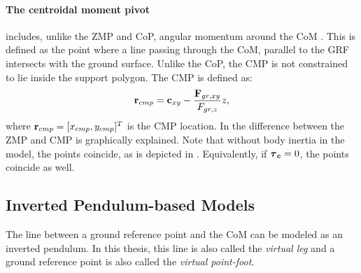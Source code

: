 \paragraph{The centroidal moment pivot} includes, unlike the \ac{ZMP} and \ac{CoP}, angular momentum around the \ac{CoM}  \cite{popovic2005ground}. This is defined as the point where a line passing through the \ac{CoM}, parallel to the \ac{GRF} intersects with the ground surface. Unlike the \ac{CoP}, the \ac{CMP} is not constrained to lie inside the support polygon. The \ac{CMP} is defined as:
\begin{equation}
    \mathbf{r}_{cmp}=\mathbf{c}_{xy}-\frac{\mathbf{F}_{gr,xy}}{F_{gr,z}}z,
    \label{eq:cmp}
\end{equation}
where $\mathbf{r}_{cmp} =[x_{cmp}, y_{cmp}]^T$ is the \ac{CMP} location. In  the difference between the \ac{ZMP} and \ac{CMP} is graphically explained. Note that without body inertia in the model, the points coincide, as is depicted in . Equivalently, if $\boldsymbol{\tau}_{\mathbf{c}}=0$, the points coincide as well.

\subsection{Inverted Pendulum-based Models}
The line between a ground reference point and the \ac{CoM} can be modeled as an inverted pendulum. In this thesis, this line is also called the \textit{virtual leg} and a ground reference point is also called the \textit{virtual point-foot}.

